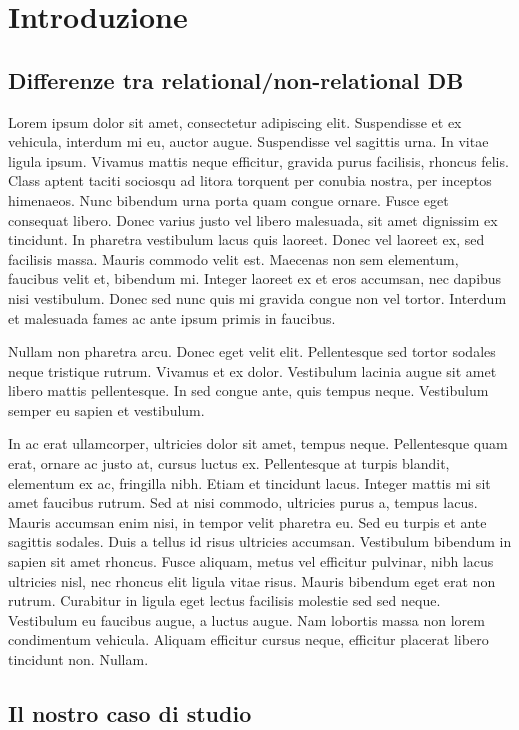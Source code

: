\chapter{Introduzione}

\section{Differenze tra relational/non-relational DB}
Lorem ipsum dolor sit amet, consectetur adipiscing elit. Suspendisse et ex vehicula, interdum mi eu, auctor augue. Suspendisse vel sagittis urna. In vitae ligula ipsum. Vivamus mattis neque efficitur, gravida purus facilisis, rhoncus felis. Class aptent taciti sociosqu ad litora torquent per conubia nostra, per inceptos himenaeos. Nunc bibendum urna porta quam congue ornare. Fusce eget consequat libero. Donec varius justo vel libero malesuada, sit amet dignissim ex tincidunt. In pharetra vestibulum lacus quis laoreet. Donec vel laoreet ex, sed facilisis massa. Mauris commodo velit est. Maecenas non sem elementum, faucibus velit et, bibendum mi. Integer laoreet ex et eros accumsan, nec dapibus nisi vestibulum. Donec sed nunc quis mi gravida congue non vel tortor. Interdum et malesuada fames ac ante ipsum primis in faucibus.

Nullam non pharetra arcu. Donec eget velit elit. Pellentesque sed tortor sodales neque tristique rutrum. Vivamus et ex dolor. Vestibulum lacinia augue sit amet libero mattis pellentesque. In sed congue ante, quis tempus neque. Vestibulum semper eu sapien et vestibulum.

In ac erat ullamcorper, ultricies dolor sit amet, tempus neque. Pellentesque quam erat, ornare ac justo at, cursus luctus ex. Pellentesque at turpis blandit, elementum ex ac, fringilla nibh. Etiam et tincidunt lacus. Integer mattis mi sit amet faucibus rutrum. Sed at nisi commodo, ultricies purus a, tempus lacus. Mauris accumsan enim nisi, in tempor velit pharetra eu. Sed eu turpis et ante sagittis sodales. Duis a tellus id risus ultricies accumsan. Vestibulum bibendum in sapien sit amet rhoncus. Fusce aliquam, metus vel efficitur pulvinar, nibh lacus ultricies nisl, nec rhoncus elit ligula vitae risus. Mauris bibendum eget erat non rutrum. Curabitur in ligula eget lectus facilisis molestie sed sed neque. Vestibulum eu faucibus augue, a luctus augue. Nam lobortis massa non lorem condimentum vehicula. Aliquam efficitur cursus neque, efficitur placerat libero tincidunt non. Nullam.

\section{Il nostro caso di studio}

